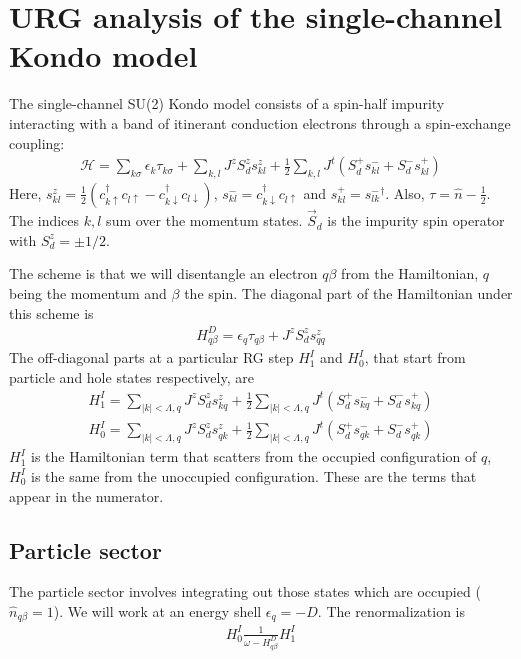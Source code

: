 \documentclass{revtex4-2}
\begin{document}
\clearpage
\appendix
\section{URG analysis of the single-channel Kondo model}
The single-channel SU(2) Kondo model consists of a spin-half impurity interacting with a band of itinerant conduction electrons through a spin-exchange coupling:
\label{1KondoURG}
\begin{align}
	\mathcal{H} = \sum_{k\sigma}\epsilon_{k}\tau_{k\sigma} + \sum_{k,l} J^z S_d^z s^z_{kl} + \frac{1}{2}\sum_{k,l} J^t \left(S_d^+ s^-_{kl}  + S_d^- s^+_{kl}\right)
\end{align}
Here, \(s^z_{kl} = \frac{1}{2}\left(c^\dagger_{k\uparrow}c_{l \uparrow} - c^\dagger_{k\downarrow}c_{l \downarrow}\right)\), \(s^-_{kl} = c^\dagger_{k \downarrow}c_{l \uparrow}\) and \(s^+_{kl} = {s^-_{lk}}^\dagger\). Also, \(\tau = \hat n - \frac{1}{2}\). The indices \(k,l\) sum over the momentum states. \(\vec S_d\) is the impurity spin operator with \(S_d^z = \pm 1/2\).

The scheme is that we will disentangle an electron \(q\beta\) from the Hamiltonian, \(q\) being the momentum and \(\beta\) the spin. The diagonal part of the Hamiltonian under this scheme is
\begin{align}
\label{kondodiag}
H^D_{q\beta} = \epsilon_q \tau_{q\beta} + J^z S_d^z s_{qq}^z
\end{align}
The off-diagonal parts at a particular RG step \(H^I_1\) and \(H^I_0\), that start from particle and hole states respectively, are
\begin{align}
	H^I_1 = \sum_{|k|<\Lambda,q} J^z S_d^z s^z_{kq} + \frac{1}{2}\sum_{|k|<\Lambda,q} J^t \left(S_d^+ s^-_{kq} + S_d^- s^+_{kq}\right)\\
	H^I_0 = \sum_{|k|<\Lambda,q} J^z S_d^z s^z_{qk} + \frac{1}{2}\sum_{|k|<\Lambda,q} J^t \left(S_d^+ s^-_{qk}  + S_d^- s^+_{qk}\right)
\end{align}
\(H^I_1\) is the Hamiltonian term that scatters from the occupied configuration of \(q\), \(H^I_0\) is the same from the unoccupied configuration.
These are the terms that appear in the numerator.
\subsection{Particle sector}
The particle sector involves integrating out those states which are occupied (\(\hat n_{q\beta}=1\)). We will work at an energy  shell \(\epsilon_q = -D\). The renormalization is
\begin{align}
	H^I_0 \frac{1}{\omega - H^D_{q\beta}} H^I_1
\end{align}
\end{document}
